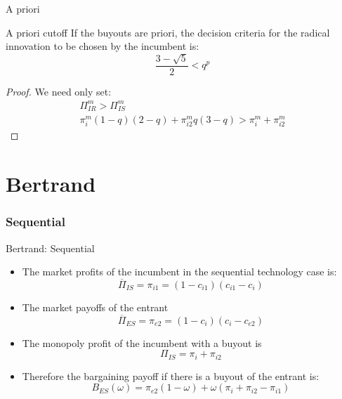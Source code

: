 \documentclass{beamer}
\begin{document}
\begin{frame}{A priori}
\begin{block}{A priori cutoff}
If the buyouts are priori, the decision criteria for the radical innovation to be chosen by the incumbent is: 
\begin{equation*}
\frac{3-\sqrt{5}}{2}<q^{p}
\end{equation*}
\end{block}

\begin{proof}
We need only set: 
\begin{align*}
\Pi_{IR}^m >\Pi_{IS}^m \\
\pi_{i}^m (1-q) (2-q)+\pi_{i2}^m q (3-q)>\pi_{i}^m +  \pi_{i2}^m 
\end{align*}
\end{proof}
\end{frame}


\section{Bertrand}
\subsubsection{Sequential}
\begin{frame}{Bertrand: Sequential}
\begin{itemize}
    \item The market profits of the incumbent in the sequential technology case is:
    \begin{equation*}
        \overline{\Pi}_{IS} = \pi_{i1}=(1-c_{i1})(c_{i1}-c_i) 
    \end{equation*}
    \item The market payoffs of the entrant 
    \begin{equation*}
        \overline{\Pi}_{ES} =  
 \pi_{e2}=(1-c_{i})(c_i-c_{e2}) 
    \end{equation*}
    \item The monopoly profit of the incumbent with a buyout is
    \begin{equation*}
        \Pi_{IS} = \pi_{i} +  \pi_{i2} 
    \end{equation*}
    \item Therefore the bargaining payoff if there is a buyout of the entrant is: 
    \begin{equation*}
       B_{ES}(\omega)=  \pi_{e2}(1-\omega)+ \omega (\pi_{i} +  \pi_{i2} - \pi_{i1} )
    \end{equation*}
\end{itemize}
\end{frame}
\end{document}
